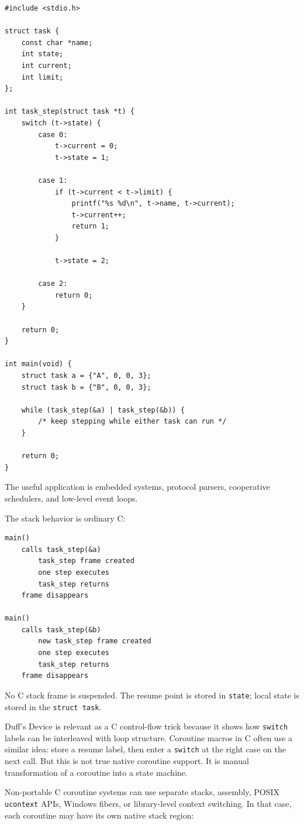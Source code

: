 \begin{verbatim}
#include <stdio.h>

struct task {
    const char *name;
    int state;
    int current;
    int limit;
};

int task_step(struct task *t) {
    switch (t->state) {
        case 0:
            t->current = 0;
            t->state = 1;

        case 1:
            if (t->current < t->limit) {
                printf("%s %d\n", t->name, t->current);
                t->current++;
                return 1;
            }

            t->state = 2;

        case 2:
            return 0;
    }

    return 0;
}

int main(void) {
    struct task a = {"A", 0, 0, 3};
    struct task b = {"B", 0, 0, 3};

    while (task_step(&a) | task_step(&b)) {
        /* keep stepping while either task can run */
    }

    return 0;
}
\end{verbatim}

The useful application is embedded systems, protocol parsers, cooperative schedulers, and low-level event loops.

The stack behavior is ordinary C:

\begin{verbatim}
main()
    calls task_step(&a)
        task_step frame created
        one step executes
        task_step returns
    frame disappears

main()
    calls task_step(&b)
        new task_step frame created
        one step executes
        task_step returns
    frame disappears
\end{verbatim}

No C stack frame is suspended. The resume point is stored in \texttt{state}; local state is stored in the \texttt{struct task}.

Duff's Device is relevant as a C control-flow trick because it shows how \texttt{switch} labels can be interleaved with loop structure. Coroutine macros in C often use a similar idea: store a resume label, then enter a \texttt{switch} at the right case on the next call. But this is not true native coroutine support. It is manual transformation of a coroutine into a state machine.

Non-portable C coroutine systems can use separate stacks, assembly, POSIX \texttt{ucontext} APIs, Windows fibers, or library-level context switching. In that case, each coroutine may have its own native stack region:

